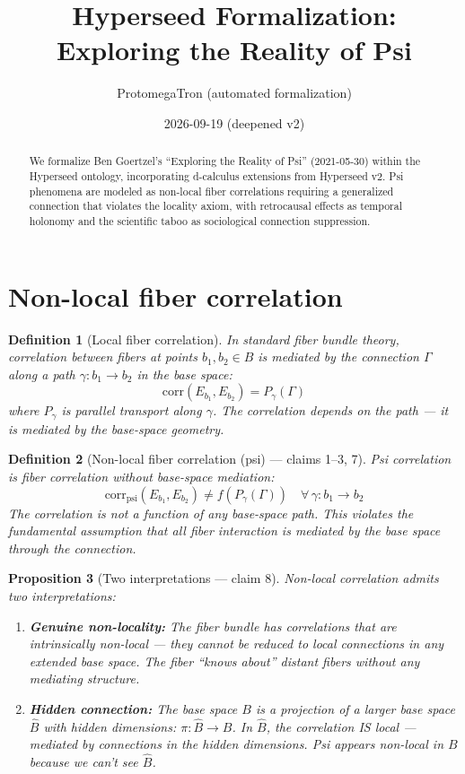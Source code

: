\documentclass[11pt,a4paper]{article}
\title{Hyperseed Formalization:\\
  Exploring the Reality of Psi}
\author{ProtomegaTron (automated formalization)}
\date{2026-09-19 (deepened v2)}
\newtheorem{definition}{Definition}[section]
\newtheorem{proposition}[definition]{Proposition}
\begin{document}
\maketitle

\begin{abstract}
We formalize Ben Goertzel's ``Exploring the Reality of Psi''
(2021-05-30) within the Hyperseed ontology, incorporating d-calculus
extensions from Hyperseed v2. Psi phenomena are modeled as non-local
fiber correlations requiring a generalized connection that violates
the locality axiom, with retrocausal effects as temporal holonomy and
the scientific taboo as sociological connection suppression.
\end{abstract}

\tableofcontents

\section{Non-local fiber correlation}

\begin{definition}[Local fiber correlation]
In standard fiber bundle theory, correlation between fibers at points
$b_1, b_2 \in B$ is mediated by the connection $\Gamma$ along a
path $\gamma: b_1 \to b_2$ in the base space:
\[
  \text{corr}(E_{b_1}, E_{b_2}) = P_\gamma(\Gamma)
\]
where $P_\gamma$ is parallel transport along $\gamma$. The correlation
depends on the path --- it is mediated by the base-space geometry.
\end{definition}

\begin{definition}[Non-local fiber correlation (psi) --- claims 1--3, 7]
\emph{Psi correlation} is fiber correlation without base-space mediation:
\[
  \text{corr}_{\text{psi}}(E_{b_1}, E_{b_2}) \neq f(P_\gamma(\Gamma))
  \quad \forall\, \gamma: b_1 \to b_2
\]
The correlation is not a function of any base-space path. This violates
the fundamental assumption that all fiber interaction is mediated by
the base space through the connection.
\end{definition}

\begin{proposition}[Two interpretations --- claim 8]
\label{prop:interp}
Non-local correlation admits two interpretations:
\begin{enumerate}
  \item \textbf{Genuine non-locality:} The fiber bundle has correlations
    that are intrinsically non-local --- they cannot be reduced to
    local connections in any extended base space. The fiber ``knows about''
    distant fibers without any mediating structure.
  \item \textbf{Hidden connection:} The base space $B$ is a projection
    of a larger base space $\hat{B}$ with hidden dimensions:
    $\pi: \hat{B} \to B$. In $\hat{B}$, the correlation IS local ---
    mediated by connections in the hidden dimensions. Psi appears
    non-local in $B$ because we can't see $\hat{B}$.
\end{enumerate}
\end{proposition}
\end{document}
